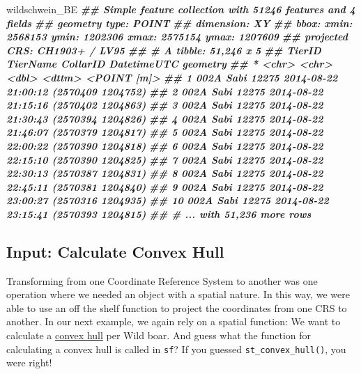 \documentclass[
]{book}
\newenvironment{Shaded}{\begin{snugshade}}{\end{snugshade}}
\newcommand{\DocumentationTok}[1]{\textcolor[rgb]{0.56,0.35,0.01}{\textbf{\textit{#1}}}}
\newcommand{\NormalTok}[1]{#1}
\begin{document}
\begin{Shaded}
\begin{Highlighting}[]
\NormalTok{wildschwein\_BE}
\DocumentationTok{\#\# Simple feature collection with 51246 features and 4 fields}
\DocumentationTok{\#\# geometry type:  POINT}
\DocumentationTok{\#\# dimension:      XY}
\DocumentationTok{\#\# bbox:           xmin: 2568153 ymin: 1202306 xmax: 2575154 ymax: 1207609}
\DocumentationTok{\#\# projected CRS:  CH1903+ / LV95}
\DocumentationTok{\#\# \# A tibble: 51,246 x 5}
\DocumentationTok{\#\#    TierID TierName CollarID DatetimeUTC                  geometry}
\DocumentationTok{\#\#  * \textless{}chr\textgreater{}  \textless{}chr\textgreater{}       \textless{}dbl\textgreater{} \textless{}dttm\textgreater{}                    \textless{}POINT [m]\textgreater{}}
\DocumentationTok{\#\#  1 002A   Sabi        12275 2014{-}08{-}22 21:00:12 (2570409 1204752)}
\DocumentationTok{\#\#  2 002A   Sabi        12275 2014{-}08{-}22 21:15:16 (2570402 1204863)}
\DocumentationTok{\#\#  3 002A   Sabi        12275 2014{-}08{-}22 21:30:43 (2570394 1204826)}
\DocumentationTok{\#\#  4 002A   Sabi        12275 2014{-}08{-}22 21:46:07 (2570379 1204817)}
\DocumentationTok{\#\#  5 002A   Sabi        12275 2014{-}08{-}22 22:00:22 (2570390 1204818)}
\DocumentationTok{\#\#  6 002A   Sabi        12275 2014{-}08{-}22 22:15:10 (2570390 1204825)}
\DocumentationTok{\#\#  7 002A   Sabi        12275 2014{-}08{-}22 22:30:13 (2570387 1204831)}
\DocumentationTok{\#\#  8 002A   Sabi        12275 2014{-}08{-}22 22:45:11 (2570381 1204840)}
\DocumentationTok{\#\#  9 002A   Sabi        12275 2014{-}08{-}22 23:00:27 (2570316 1204935)}
\DocumentationTok{\#\# 10 002A   Sabi        12275 2014{-}08{-}22 23:15:41 (2570393 1204815)}
\DocumentationTok{\#\# \# ... with 51,236 more rows}
\end{Highlighting}
\end{Shaded}

\hypertarget{input-calculate-convex-hull}{%
\subsection{Input: Calculate Convex Hull}\label{input-calculate-convex-hull}}

Transforming from one Coordinate Reference System to another was one operation where we needed an object with a spatial nature. In this way, we were able to use an off the shelf function to project the coordinates from one CRS to another. In our next example, we again rely on a spatial function: We want to calculate a \href{https://en.wikipedia.org/wiki/Convex_hull}{convex hull} per Wild boar. And guess what the function for calculating a convex hull is called in \texttt{sf}? If you guessed \texttt{st\_convex\_hull()}, you were right!
\end{document}
